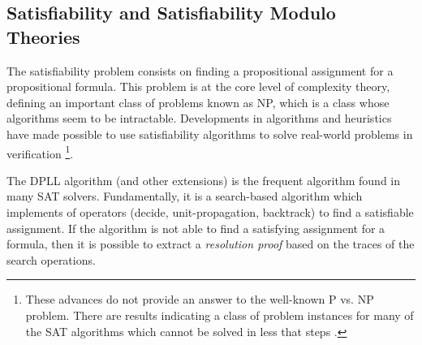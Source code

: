\subsection{Satisfiability and Satisfiability Modulo Theories}

The satisfiability problem consists on finding a 
propositional assignment for a propositional formula. 
This problem is at the core level of complexity theory, 
defining an important class of problems known as 
NP, which is a class whose
algorithms seem to be intractable.
Developments in algorithms and heuristics \cite{10.5555/2898950, 
935565} have made possible to use satisfiability algorithms 
to solve real-world problems in verification \footnote{These
  advances do not provide an answer to the well-known P vs. NP
  problem. There are results indicating a class of problem instances
  for many of the SAT algorithms which cannot be solved in less that
   steps \cite{10.5555/2898950}.
}.

The DPLL algorithm \cite{10.1145/368273.368557} 
(and other extensions) is the frequent algorithm
found in many SAT solvers. Fundamentally, it is a search-based algorithm
which implements of operators (decide, unit-propagation, backtrack)
to find a satisfiable assignment. If the algorithm is not able to
find a satisfying assignment for a formula, then it is possible to 
extract a \emph{resolution proof} based on the traces of the search
operations.

